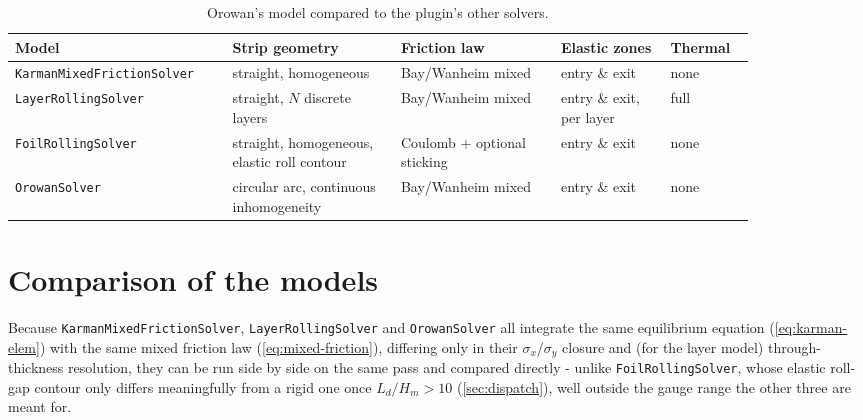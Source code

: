 \documentclass[11pt]{PyRollDocs}
\begin{document}
    \begin{table}
        \centering
        \caption{Orowan's model compared to the plugin's other solvers.}
        \label{tab:orowan-comparison}
        \begin{tabular}{@{}p{0.24\linewidth}p{0.20\linewidth}p{0.19\linewidth}p{0.13\linewidth}p{0.10\linewidth}@{}}
            \toprule
            Model & Strip geometry & Friction law & Elastic zones & Thermal \\
            \midrule
            \texttt{Karman\-Mixed\-Friction\-Solver} & straight, homogeneous & Bay/Wanheim mixed & entry \& exit & none \\
            \texttt{Layer\-Rolling\-Solver} & straight, $N$ discrete layers & Bay/Wanheim mixed & entry \& exit, per layer & full \\
            \texttt{Foil\-Rolling\-Solver} & straight, homogeneous, elastic roll contour & Coulomb + optional sticking & entry \& exit & none \\
            \texttt{Orowan\-Solver} & circular arc, continuous inhomogeneity & Bay/Wanheim mixed & entry \& exit & none \\
            \bottomrule
        \end{tabular}
    \end{table}


    \section{Comparison of the models}\label{sec:comparison}

    Because \lstinline{KarmanMixedFrictionSolver}, \lstinline{LayerRollingSolver} and \lstinline{OrowanSolver} all integrate the same equilibrium equation (\autoref{eq:karman-elem}) with the same mixed friction law (\autoref{eq:mixed-friction}), differing only in their $\sigma_x$/$\sigma_y$ closure and (for the layer model) through-thickness resolution, they can be run side by side on the same pass and compared directly - unlike \lstinline{FoilRollingSolver}, whose elastic roll-gap contour only differs meaningfully from a rigid one once $L_d/H_m > 10$ (\autoref{sec:dispatch}), well outside the gauge range the other three are meant for.
\end{document}
